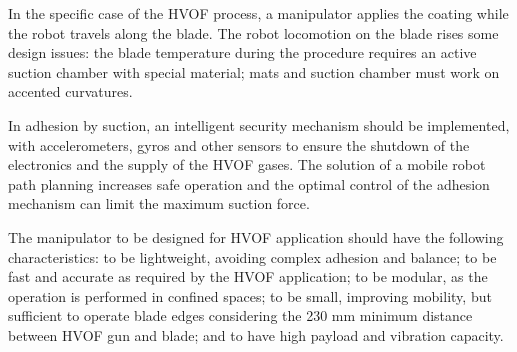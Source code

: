 In the specific case of the HVOF process, a manipulator applies the coating 
while the robot travels along the blade. The robot locomotion on the blade rises
some design issues: the blade temperature during the procedure requires an
active suction chamber with special material; mats and suction chamber must work
on accented curvatures.



In adhesion by suction, an intelligent security mechanism should be implemented,
with accelerometers, gyros and other sensors to ensure the shutdown of the
electronics and the supply of the HVOF gases. The solution of a mobile robot
path planning increases safe operation and the optimal control of the adhesion
mechanism can limit the maximum suction force.


The manipulator to be designed for HVOF application should have the following
characteristics: to be lightweight, avoiding complex adhesion and balance;
to be fast and accurate as required by the HVOF application; to be modular, as
the operation is performed in confined spaces; to be small, improving mobility,
but sufficient to operate blade edges considering the 230 mm minimum distance
between HVOF gun and blade; and to have high payload and vibration capacity.


